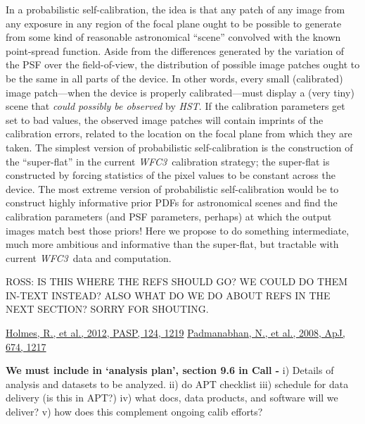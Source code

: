\documentclass[12pt]{article}
\newcommand{\project}[1]{\textsl{#1}}
\newcommand{\HST}{\project{HST}}
\newcommand{\WFC}{\project{WFC3}}
\begin{document}
In a probabilistic self-calibration, the idea is that any patch of any
image from any exposure in any region of the focal plane ought to be
possible to generate from some kind of reasonable astronomical
``scene'' convolved with the known point-spread function.  Aside from
the differences generated by the variation of the PSF over the
field-of-view, the distribution of possible image patches ought to be
the same in all parts of the device.  In other words, every small
(calibrated) image patch---when the device is properly
calibrated---must display a (very tiny) scene that \emph{could
  possibly be observed} by \HST.  If the calibration parameters get
set to bad values, the observed image patches will contain imprints of
the calibration errors, related to the location on the focal plane
from which they are taken.  The simplest version of probabilistic
self-calibration is the construction of the ``super-flat'' in the
current \WFC\ calibration strategy; the super-flat is constructed by
forcing statistics of the pixel values to be constant across the
device.  The most extreme version of probabilistic self-calibration
would be to construct highly informative prior PDFs for astronomical
scenes and find the calibration parameters (and PSF parameters,
perhaps) at which the output images match best those priors!  Here we
propose to do something intermediate, much more ambitious and
informative than the super-flat, but tractable with current \WFC\ data
and computation.

ROSS: IS THIS WHERE THE REFS SHOULD GO?  WE COULD DO THEM IN-TEXT
INSTEAD?  ALSO WHAT DO WE DO ABOUT REFS IN THE NEXT SECTION?  SORRY
FOR SHOUTING.

\begin{flushleft} 
\href{http://bit.ly/15TAoYy}{Holmes, R., et al., 2012, PASP, 124,
  1219} \newline
\href{http://bit.ly/12dPkSh}{Padmanabhan, N., et al., 2008, ApJ, 674, 1217}
\end{flushleft}

%
%
\describearchival       %


{\color{red} \textbf{We must include in `analysis plan', section 9.6 in Call -} 
i) Details of analysis and datasets to be analyzed.  ii) do APT
checklist iii) schedule for data delivery (is this in APT?) iv) what
docs, data products, and software will we deliver? v) how does this 
complement ongoing calib efforts?}
\end{document}
